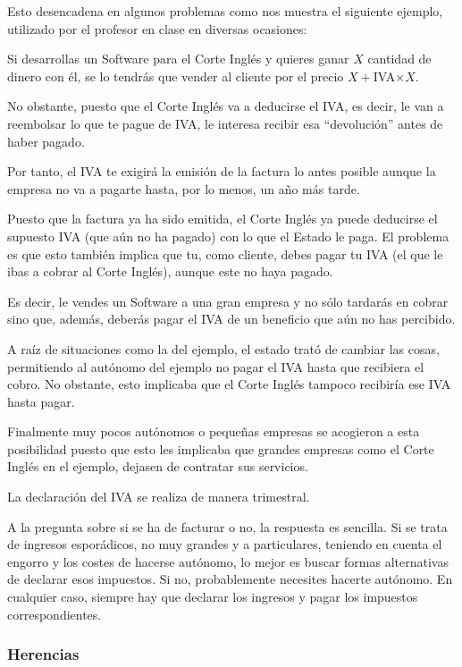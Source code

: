 \documentclass[nochap,palatino,shortheader]{apuntes}
\begin{document}
Esto desencadena en algunos problemas como nos muestra el siguiente ejemplo, utilizado por el profesor en clase en diversas ocasiones:
\begin{example}
Si desarrollas un Software para el Corte Inglés y quieres ganar $X$ cantidad de dinero con él, se lo tendrás que vender al cliente por el precio $X+$IVA$\times X$.

No obstante, puesto que el Corte Inglés va a deducirse el IVA, es decir, le van a reembolsar lo que te pague de IVA, le interesa recibir esa ``devolución'' antes de haber pagado.

Por tanto, el IVA te exigirá la emisión de la factura lo antes posible aunque la empresa no va a pagarte hasta, por lo menos, un año más tarde.

Puesto que la factura ya ha sido emitida, el Corte Inglés ya puede deducirse el supuesto IVA (que aún no ha pagado) con lo que el Estado le paga. El problema es que esto también implica que tu, como cliente, debes pagar tu IVA (el que le ibas a cobrar al Corte Inglés), aunque este no haya pagado.

Es decir, le vendes un Software a una gran empresa y no sólo tardarás en cobrar sino que, además, deberás pagar el IVA de un beneficio que aún no has percibido.
\end{example}

A raíz de situaciones como la del ejemplo, el estado trató de cambiar las cosas, permitiendo al autónomo del ejemplo no pagar el IVA hasta que recibiera el cobro. No obstante, esto implicaba que el Corte Inglés tampoco recibiría ese IVA hasta pagar.

Finalmente muy pocos autónomos o pequeñas empresas se acogieron a esta posibilidad puesto que esto les implicaba que grandes empresas como el Corte Inglés en el ejemplo, dejasen de contratar sus servicios.

\obs La declaración del IVA se realiza de manera trimestral.

A la pregunta sobre si se ha de facturar o no, la respuesta es sencilla. Si se trata de ingresos esporádicos, no muy grandes y a particulares, teniendo en cuenta el engorro y los costes de hacerse autónomo, lo mejor es buscar formas alternativas de declarar esos impuestos. Si no, probablemente necesites hacerte autónomo. En cualquier caso, siempre hay que declarar los ingresos y pagar los impuestos correspondientes.

\subsubsection{Herencias}
\end{document}
